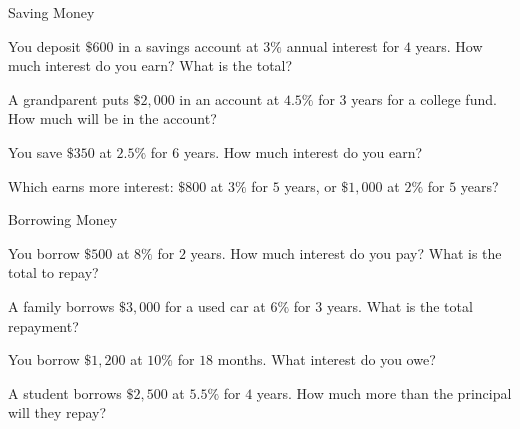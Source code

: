 \begin{practiceBox}{Saving Money}


\prob You deposit $\$600$ in a savings account at $3\%$ annual interest for $4$ years. How much interest do you earn? What is the total?
\answerBlank[4cm]

\prob A grandparent puts $\$2{,}000$ in an account at $4.5\%$ for $3$ years for a college fund. How much will be in the account?
\answerBlank[4cm]

\prob You save $\$350$ at $2.5\%$ for $6$ years. How much interest do you earn?
\answerBlank[3cm]

\prob Which earns more interest: $\$800$ at $3\%$ for $5$ years, or $\$1{,}000$ at $2\%$ for $5$ years?
\answerBlank[4cm]

\end{practiceBox}

\begin{practiceBox}[funTeal]{Borrowing Money}


\prob You borrow $\$500$ at $8\%$ for $2$ years. How much interest do you pay? What is the total to repay?
\answerBlank[4cm]

\prob A family borrows $\$3{,}000$ for a used car at $6\%$ for $3$ years. What is the total repayment?
\answerBlank[4cm]

\prob You borrow $\$1{,}200$ at $10\%$ for $18$ months. What interest do you owe?
\answerBlank[3cm]

\prob A student borrows $\$2{,}500$ at $5.5\%$ for $4$ years. How much more than the principal will they repay?
\answerBlank[3cm]

\end{practiceBox}


